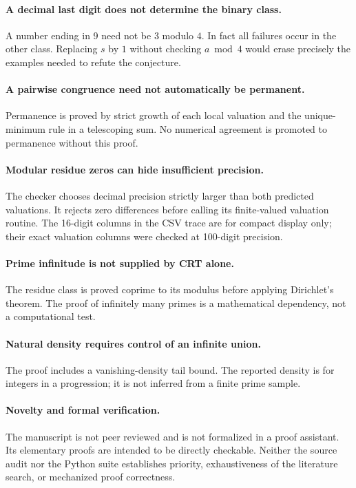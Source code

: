 \documentclass[11pt,letterpaper]{article}
\numberwithin{equation}{section}
\theoremstyle{definition}
\theoremstyle{remark}
\begin{document}
\paragraph{A decimal last digit does not determine the binary class.}
A number ending in 9 need not be $3$ modulo $4$. In fact all failures occur in the other class. Replacing $s$ by $1$ without checking $a\bmod4$ would erase precisely the examples needed to refute the conjecture.

\paragraph{A pairwise congruence need not automatically be permanent.}
Permanence is proved by strict growth of each local valuation and the unique-minimum rule in a telescoping sum. No numerical agreement is promoted to permanence without this proof.

\paragraph{Modular residue zeros can hide insufficient precision.}
The checker chooses decimal precision strictly larger than both predicted valuations. It rejects zero differences before calling its finite-valued valuation routine. The 16-digit columns in the CSV trace are for compact display only; their exact valuation columns were checked at 100-digit precision.

\paragraph{Prime infinitude is not supplied by CRT alone.}
The residue class is proved coprime to its modulus before applying Dirichlet's theorem. The proof of infinitely many primes is a mathematical dependency, not a computational test.

\paragraph{Natural density requires control of an infinite union.}
The proof includes a vanishing-density tail bound. The reported density is for integers in a progression; it is not inferred from a finite prime sample.

\paragraph{Novelty and formal verification.}
The manuscript is not peer reviewed and is not formalized in a proof assistant. Its elementary proofs are intended to be directly checkable. Neither the source audit nor the Python suite establishes priority, exhaustiveness of the literature search, or mechanized proof correctness.
\end{document}
